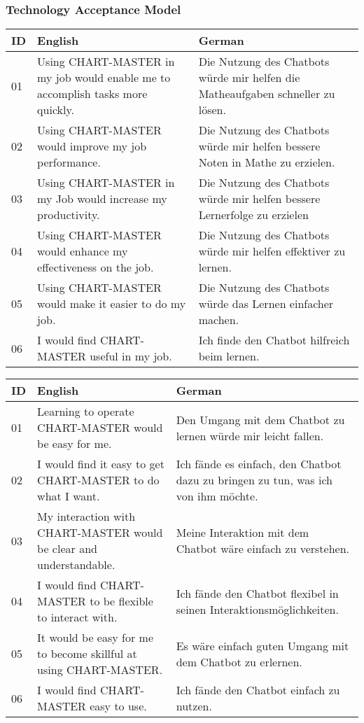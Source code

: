 \subsubsection*{Technology Acceptance Model}

\begin{ctable}
    \begin{tabularx}{\textwidth}{l|X|X}
        \textbf{ID} & \textbf{English} & \textbf{German} \\
        \hline
        01 & Using CHART-MASTER in my job would enable me to accomplish tasks more quickly. & Die Nutzung des Chatbots würde mir helfen die Matheaufgaben schneller zu lösen. \\
        02 & Using CHART-MASTER would improve my job performance. & Die Nutzung des Chatbots würde mir helfen bessere Noten in Mathe zu erzielen. \\
        03 & Using CHART-MASTER in my Job would increase my productivity. & Die Nutzung des Chatbots würde mir helfen bessere Lernerfolge zu erzielen \\
        04 & Using CHART-MASTER would enhance my effectiveness on the job. & Die Nutzung des Chatbots würde mir helfen effektiver zu lernen. \\
        05 & Using CHART-MASTER would make it easier to do my job. & Die Nutzung des Chatbots würde das Lernen einfacher machen. \\
        06 & I would find CHART-MASTER useful in my job. & Ich finde den Chatbot hilfreich beim lernen. \\
    \end{tabularx}
\end{ctable}

\begin{ctable}
    \begin{tabularx}{\textwidth}{l|X|X}
        \textbf{ID} & \textbf{English} & \textbf{German} \\
        \hline
        01 & Learning to operate CHART-MASTER would be easy for me. & Den Umgang mit dem Chatbot zu lernen würde mir leicht fallen. \\
        02 & I would find it easy to get CHART-MASTER to do what I want. & Ich fände es einfach, den Chatbot dazu zu bringen zu tun, was ich von ihm möchte. \\
        03 & My interaction with CHART-MASTER would be clear and understandable. & Meine Interaktion mit dem Chatbot wäre einfach zu verstehen. \\
        04 & I would find CHART-MASTER to be flexible to interact with. & Ich fände den Chatbot flexibel in seinen Interaktionsmöglichkeiten. \\
        05 & It would be easy for me to become skillful at using CHART-MASTER. & Es wäre einfach guten Umgang mit dem Chatbot zu erlernen. \\
        06 & I would find CHART-MASTER easy to use. & Ich fände den Chatbot einfach zu nutzen. \\
    \end{tabularx}
\end{ctable}

